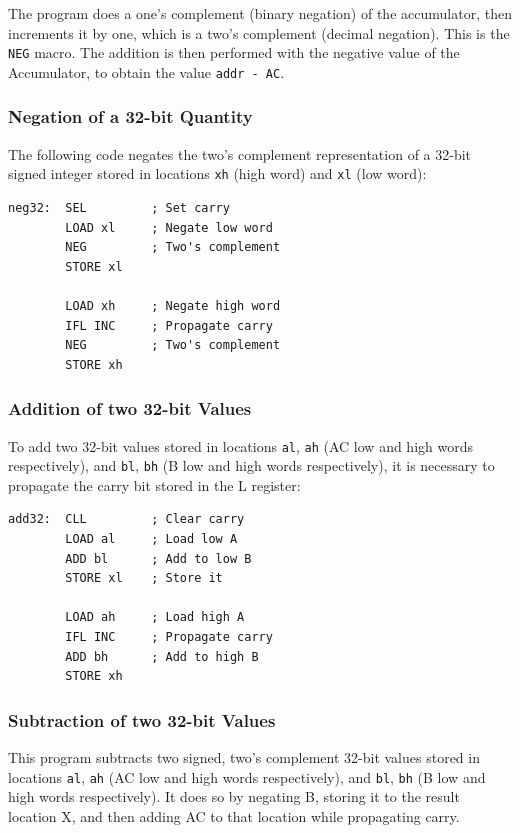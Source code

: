 \documentclass[11pt,a4paper,twocolumns]{article}
\newcommand\register[1]{\textsf{#1}}
\newcommand\A{\register{AC}}
\newcommand\Lreg{\register{L}}
\begin{document}
The program does a one's complement (binary negation) of the
accumulator, then increments it by one, which is a two's complement
(decimal negation). This is the {\tt NEG} macro. The addition is then
performed with the negative value of the Accumulator, to obtain the
value {\tt addr - AC}.

\subsubsection{Negation of a 32-bit Quantity}

The following code negates the two's complement representation of a
32-bit signed integer stored in locations {\tt xh} (high word) and
{\tt xl} (low word):

\begin{verbatim}
neg32:  SEL         ; Set carry
        LOAD xl     ; Negate low word
        NEG         ; Two's complement
        STORE xl

        LOAD xh     ; Negate high word
        IFL INC     ; Propagate carry
        NEG         ; Two's complement
        STORE xh
\end{verbatim}

\subsubsection{Addition of two 32-bit Values}

To add two 32-bit values stored in locations {\tt al}, {\tt ah} (\A{} low
and high words respectively), and {\tt bl}, {\tt bh} (B low and high
words respectively), it is necessary to propagate the carry bit
stored in the \Lreg{} register:

\begin{verbatim}
add32:  CLL         ; Clear carry
        LOAD al     ; Load low A
        ADD bl      ; Add to low B
        STORE xl    ; Store it

        LOAD ah     ; Load high A
        IFL INC     ; Propagate carry
        ADD bh      ; Add to high B
        STORE xh
\end{verbatim}


\subsubsection{Subtraction of two 32-bit Values}

This program subtracts two signed, two's complement 32-bit values
stored in locations {\tt al}, {\tt ah} (\A{} low and high words
respectively), and {\tt bl}, {\tt bh} (B low and high words
respectively). It does so by negating B, storing it to the result
location X, and then adding \A{} to that location while propagating
carry.
\end{document}
